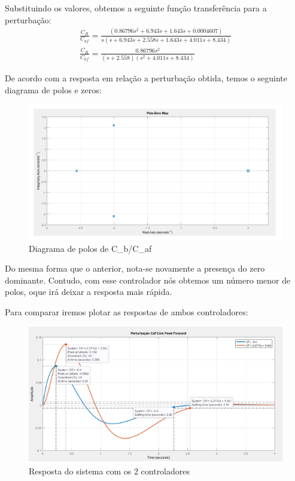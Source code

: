\documentclass[a4paper,12pt]{article}
\begin{document}
Substituindo os valores, obtemos a seguinte função transferência para a perturbação:
\begin{align}
    \frac{C_B}{C_{af}} = \frac{(0.86796s^2 + 6.943 s + 1.643 s + 0.0004607)}{s(s + 6.943s + 2.558s + 1.643s + 4.011s + 8.434)}\\
\frac{C_B}{C_{af}} = \frac{0.86796s^2}{ (s+ 2.558)  (s^2+ 4.011s + 8.434)}
\end{align}


De acordo com a resposta em relação a perturbação obtida, temos o seguinte diagrama de polos e zeros:

\begin{figure} [H]
    \centering
    \includegraphics[width=0.8\linewidth]{image18.png}
    \caption{Diagrama de polos de C_b/C_{af}}
    
\end{figure}

Do mesma forma que o anterior, nota-se novamente a presença do zero dominante.
Contudo, com esse controlador nós obtemos um número menor de polos, oque irá deixar a resposta mais rápida. 

Para comparar iremos plotar as respostas de ambos controladores: 

\begin{figure} [H]
    \centering
    \includegraphics[width=0.8\linewidth]{image19.png}
    \caption{Resposta do sistema com os 2 controladores}
    
\end{figure}
\end{document}
